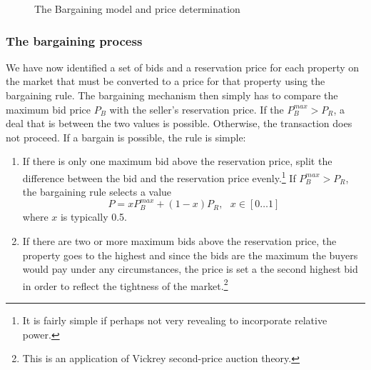  
    \begin{figure}[!thb]
    \centering
    
    \caption{The Bargaining model and price determination}
    \label{fig:Bargaining}
    \end{figure}



\subsubsection{The bargaining process}
We have now identified a set of bids and a reservation price for each property on the market that must be converted to a price for that property using the bargaining rule. 
The bargaining  mechanism then simply has to compare the maximum bid price $P_B$ with the seller's reservation price. If the $P_B^{max}>P_R$, a deal that is between the two values is possible. Otherwise, the transaction does not proceed.
If a bargain is possible, the rule is simple: 
\begin{enumerate}
    \item If there is only one maximum bid above the reservation price, split the difference between the bid and the reservation price evenly.\footnote{It is fairly simple if perhaps not very revealing to incorporate relative power. %
    }
    If $P_B^{max}>P_R$,  the bargaining rule selects a value 
    \[P = xP_B^{max}+(1-x)P_R, \ \ \ x\in [0\dots 1] \]
where $x$ is typically 0.5.
    \item If there are two or more maximum bids above the reservation price, the property goes to the highest and since the bids are the maximum the buyers would pay under any circumstances, the price is set a the second highest bid in order to reflect the tightness of the market.\footnote{This is an application of Vickrey \gls{second-price auction} theory\cite{levinAuctionTheory2004}.} 

\end{enumerate}
 



